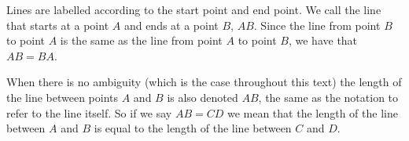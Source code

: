       \label{m39370*id313170}Lines are labelled according to the start point and end point. We call the line that starts at a point \begin{math}A\end{math} and ends at a point \begin{math}B\end{math}, \begin{math}AB\end{math}. Since the line from point \begin{math}B\end{math} to point \begin{math}A\end{math} is the same as the line from point \begin{math}A\end{math} to point \begin{math}B\end{math}, we have that \begin{math}AB=BA\end{math}.\par 
      \label{m39370*id313175}When there is no ambiguity (which is the case throughout this text) the length of the line between points \begin{math}A\end{math} and \begin{math}B\end{math} is also denoted \begin{math}AB\end{math}\hspace{1ex}, the same as the notation to refer to the line itself. So if we say \begin{math}AB=CD\end{math}\hspace{1ex} we mean that the length of the line between \begin{math}A\end{math} and \begin{math}B\end{math} is equal to the length of the line between \begin{math}C\end{math} and \begin{math}D\end{math}.
\par 

